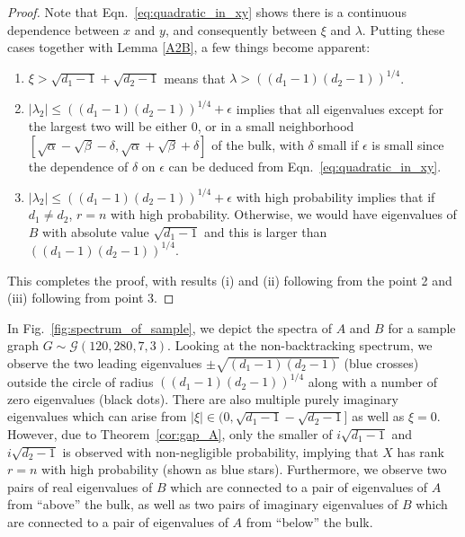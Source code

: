 \begin{proof}
Note that Eqn.~\ref{eq:quadratic_in_xy} 
shows there is a continuous dependence between $x$ and $y$, 
and consequently between $\xi$ and $\lambda$.
Putting these cases together with Lemma \ref{A2B}, a few things become apparent:
\begin{enumerate}
\item $\xi>\sqrt{d_1-1}+ \sqrt{d_2-1}$ means that 
$\lambda> ((d_1-1)(d_2-1))^{1/4}$.
\item $|\lambda_2| \leq ((d_1-1)(d_2-1))^{1/4} + \epsilon$ 
implies that all eigenvalues except for the largest two 
will be either $0$, or in a small neighborhood 
$[\sqrt{\alpha} -\sqrt{\beta} - \delta, 
\sqrt{\alpha} + \sqrt{\beta} + \delta]$ 
of the bulk, with $\delta$ small if $\epsilon$ is small since the dependence of $\delta$ on $\epsilon$ can be deduced from Eqn.~\ref{eq:quadratic_in_xy}. 
\item $|\lambda_2| \leq ((d_1-1)(d_2-1))^{1/4} + \epsilon$ 
with high probability implies that if 
$d_1 \neq d_2$, 
$r=n$ with high probability.
Otherwise, we would have eigenvalues of $B$ with 
absolute value $\sqrt{d_1-1}$ 
and this is larger than $((d_1-1)(d_2-1))^{1/4}$.
\end{enumerate}
This completes the proof, with results (i) and (ii) following from the point 2 and (iii) following from point 3.
\end{proof}


In Fig.~\ref{fig:spectrum_of_sample}, 
we depict the spectra of $A$ and $B$ for a sample graph
$G \sim \mathcal{G}(120,280,7,3)$.
Looking at the non-backtracking spectrum, 
we observe the two leading eigenvalues $\pm \sqrt{(d_1 - 1 )(d_2 - 1)}$
(blue crosses) outside the circle of radius 
$((d_1 - 1)(d_2 - 1))^{1/4}$
along with a number of zero eigenvalues (black dots).
There are also multiple purely imaginary eigenvalues 
which can arise from $|\xi| \in (0, \sqrt{d_1 - 1} - \sqrt{d_2 - 1}]$
as well as $\xi = 0$.
However, due to Theorem~\ref{cor:gap_A},
only the smaller of $i \sqrt{d_1 - 1}$ and $i \sqrt{d_2 - 1}$ 
is observed with non-negligible probability,
implying that $X$ has rank $r = n$ with high probability
(shown as blue stars).
Furthermore, we observe two pairs of real eigenvalues of $B$ which are connected to a pair of eigenvalues of $A$ from ``above'' the bulk, as well as two pairs of imaginary eigenvalues of $B$ which are connected to a pair of eigenvalues of $A$ from ``below'' the bulk.
